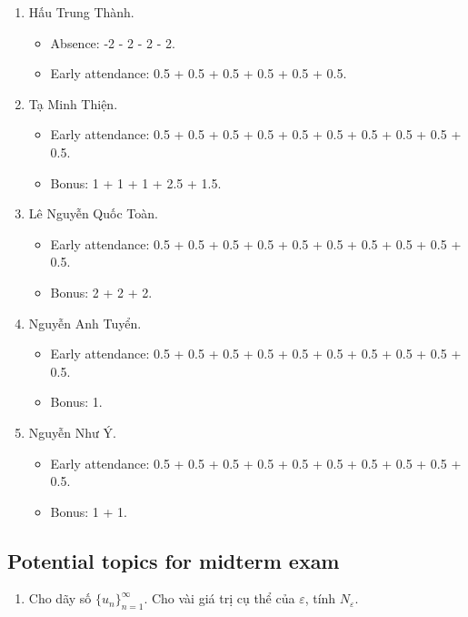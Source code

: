 \documentclass{article}
\begin{document}
\begin{enumerate}
\begin{itemize}
	\end{itemize}
	\item {\sc Hấu Trung Thành.}
	\begin{itemize}
		\item Absence: -2 - 2 - 2 - 2.
		\item Early attendance: 0.5 + 0.5 + 0.5 + 0.5 + 0.5 + 0.5.
	\end{itemize}
	\item {\sc Tạ Minh Thiện.}
	\begin{itemize}
		\item Early attendance: 0.5 + 0.5 + 0.5 + 0.5 + 0.5 + 0.5 + 0.5 + 0.5 + 0.5 + 0.5.
		\item Bonus: 1 + 1 + 1 + 2.5 + 1.5.
	\end{itemize}
	\item {\sc Lê Nguyễn Quốc Toàn.}
	\begin{itemize}
		\item Early attendance: 0.5 + 0.5 + 0.5 + 0.5 + 0.5 + 0.5 + 0.5 + 0.5 + 0.5 + 0.5.
		\item Bonus: 2 + 2 + 2.
	\end{itemize}
	\item {\sc Nguyễn Anh Tuyển.}
	\begin{itemize}
		\item Early attendance: 0.5 + 0.5 + 0.5 + 0.5 + 0.5 + 0.5 + 0.5 + 0.5 + 0.5 + 0.5.
		\item Bonus: 1.
	\end{itemize}
	\item {\sc Nguyễn Như Ý.}
	\begin{itemize}
		\item Early attendance: 0.5 + 0.5 + 0.5 + 0.5 + 0.5 + 0.5 + 0.5 + 0.5 + 0.5 + 0.5.
		\item Bonus: 1 + 1.
	\end{itemize}
\end{enumerate}


\subsection{Potential topics for midterm exam}

\begin{enumerate}
	\item Cho dãy số $\{u_n\}_{n=1}^\infty$. Cho vài giá trị cụ thể của $\varepsilon$, tính $N_\varepsilon$.
\end{enumerate}
\end{document}
